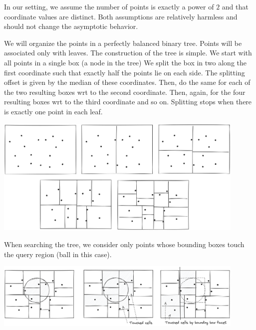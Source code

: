 \documentclass{article}
\begin{document}
In our setting, we assume the number of points is exactly a power of $2$ and that coordinate values are distinct. 
Both assumptions are relatively harmless and should not change the asymptotic behavior. 

We will organize the points in a perfectly balanced binary tree. Points will be associated only with leaves. 
The construction of the tree is simple. We start with all points in a single box (a node in the tree) 
We split the box in two along the first coordinate such that exactly half the points lie on each side. 
The splitting offset is given by the median of these coordinates. 
Then, do the same for each of the two resulting boxes wrt to the second coordinate.
Then, again, for the four resulting boxes wrt to the third coordinate and so on.
Splitting stops when there is exactly one point in each leaf.


\begin{center}
\includegraphics[width=0.9\textwidth]{images/kdtrees-construction.png}
\end{center}


When searching the tree, we consider only points whose bounding boxes touch the query region (ball in this case).

\begin{center}
\includegraphics[width=0.9\textwidth]{images/kdtrees-search.png}
\end{center}
\end{document}
